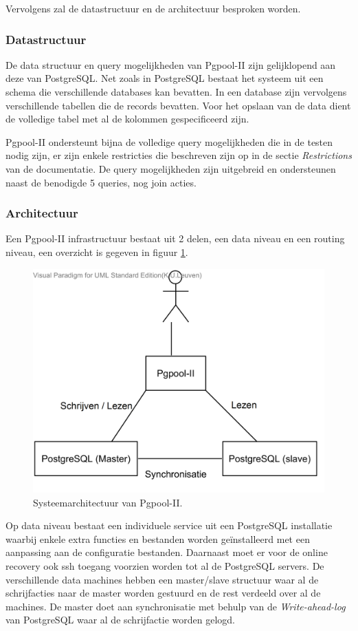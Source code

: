 Vervolgens zal de datastructuur en de architectuur besproken worden.  
\subsubsection{Datastructuur}
De data structuur en query mogelijkheden van Pgpool-II zijn gelijklopend aan deze van PostgreSQL. Net zoals in PostgreSQL bestaat het systeem uit een schema die verschillende databases kan bevatten. In een database zijn vervolgens verschillende tabellen die de records bevatten. Voor het opslaan van de data dient de volledige tabel met al de kolommen gespecificeerd zijn. 

Pgpool-II ondersteunt bijna de volledige query mogelijkheden die in de testen nodig zijn, er zijn enkele restricties die beschreven zijn op in de sectie \textit{Restrictions} van de documentatie\cite{pgpool-doc}. De query mogelijkheden zijn uitgebreid en ondersteunen naast de benodigde 5 queries, nog join acties. 

\subsubsection{Architectuur}
Een Pgpool-II infrastructuur bestaat uit 2 delen, een data niveau en een routing niveau, een overzicht is gegeven in figuur \ref{fig:Pgpool-structure}. 

\begin{figure}[h!]
\centering
\includegraphics[width=0.5\linewidth]{img/Pgpool-structuur.png}
\caption{Systeemarchitectuur van Pgpool-II.}
\label{fig:Pgpool-structure}
\end{figure}

Op data niveau bestaat een individuele service uit een PostgreSQL installatie waarbij enkele extra functies en bestanden worden geïnstalleerd met een aanpassing aan de configuratie bestanden.  Daarnaast moet er voor de online recovery ook ssh toegang voorzien worden tot al de PostgreSQL servers. De verschillende data machines hebben een master/slave structuur waar al de schrijfacties naar de master worden gestuurd en de rest verdeeld over al de machines. De master doet aan synchronisatie met behulp van de \textit{Write-ahead-log} van PostgreSQL waar al de schrijfactie worden gelogd. 

